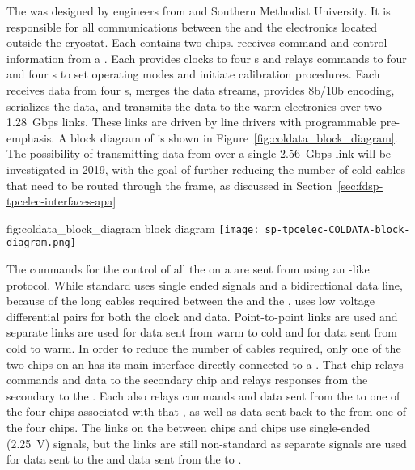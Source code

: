 The   was designed by engineers from  
and Southern Methodist University. It is responsible for all communications 
between the  and the electronics located outside the cryostat. 
Each  contains two  chips.  receives 
command and control information from a . Each  provides 
clocks to four s and relays commands to four  
  and four s to set operating modes and 
initiate calibration procedures.  Each  receives data from four 
s, merges the data streams, provides 8b/10b encoding, serializes 
the data, and transmits the data to the warm electronics over two \SI{1.28}{Gbps} 
links.  These links are driven by line drivers with programmable pre-emphasis. 
A block diagram of  is shown in Figure~\ref{fig:coldata_block_diagram}.
The possibility of transmitting data from  over a single 
\SI{2.56}{Gbps} link will be investigated in 2019, with the goal of further
reducing the number of cold cables that need to be routed through the
 frame, as discussed in Section~\ref{sec:fdsp-tpcelec-interfaces-apa}

\begin{dunefigure}
{fig:coldata_block_diagram}
{ block diagram}
\texttt{[image: sp-tpcelec-COLDATA-block-diagram.png]}
\end{dunefigure}

The commands for the control of all the  on a  are sent 
from  using an -like~\cite{bib:I2C} protocol. While standard 
 uses single ended  signals and a bidirectional data 
line, because of the long cables required between the  and the 
,  uses low voltage differential pairs for both 
the  clock and data. Point-to-point links are used and separate 
links are used for data sent from warm to cold and for data sent from cold to 
warm. In order to reduce the number of cables required, only one of the two 
 chips on an  has its main  interface 
directly connected to a . That  chip relays  
commands and data to the secondary  chip and relays  
responses from the secondary  to the . Each 
 also relays  commands and data sent from the 
 to one of the four  chips associated with that 
, as well as data sent back to the  from one of the 
four  chips. The links on the  between  
chips and  chips use single-ended (\SI{2.25}{V})  
signals, but the  links are still non-standard as separate signals 
are used for data sent to the  and data sent from the 
 to .

